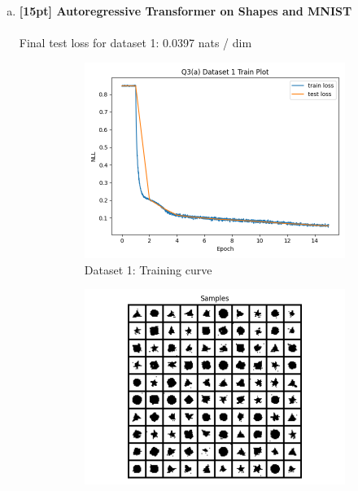 \documentclass{article}
\begin{document}
\newpage
{}

\begin{enumerate}[(a)]
\item {\bf [15pt] Autoregressive Transformer on Shapes and MNIST} \\\\
Final test loss for dataset 1: 0.0397  nats / dim
\begin{figure}[H]
    \centering
    \begin{subfigure}{0.45\textwidth}
        \centering
        \includegraphics[width=\textwidth]{figures/q3_a_dset1_train_plot.png}
        \caption{Dataset 1: Training curve}
    \end{subfigure}
    \hspace{0.2in}
    \begin{subfigure}{0.45\textwidth}
        \centering
        \includegraphics[width=\textwidth]{figures/q3_a_dset1_samples.png}

\end{subfigure}
\end{figure}
\end{enumerate}
\end{document}
